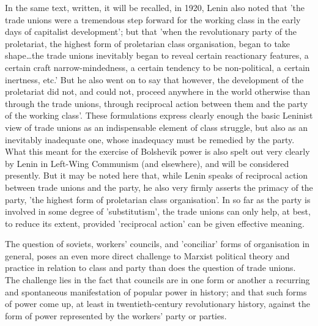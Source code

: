 In the same text, written, it will be recalled, in 1920, Lenin also noted that 'the trade unions were a tremendous step forward for the working class in the early days of capitalist development'; but that 'when the revolutionary party of the proletariat, the highest form of proletarian class organisation, began to take shape\dots the trade unions inevitably began to reveal certain reactionary features, a certain craft narrow-mindedness, a certain tendency to be non-political, a certain inertness, etc.' But he also went on to say that however, the development of the proletariat did not, and could not, proceed anywhere in the world otherwise than through the trade unions, through reciprocal action between them and the party of the working class'. These formulations express clearly enough the basic Leninist view of trade unions as an indispensable element of class struggle, but also as an inevitably inadequate one, whose inadequacy must be remedied by the party. What this meant for the exercise of Bolshevik power is also spelt out very clearly by Lenin in Left-Wing Communism (and elsewhere), and will be considered presently. But it may be noted here that, while Lenin speaks of reciprocal action between trade unions and the party, he also very firmly asserts the primacy of the party, 'the highest form of proletarian class organisation'. In so far as the party is involved in some degree of 'substitutism', the trade unions can only help, at best, to reduce its extent, provided 'reciprocal action' can be given effective meaning.

The question of soviets, workers' councils, and 'conciliar' forms of organisation in general, poses an even more direct challenge to Marxist political theory and practice in relation to class and party than does the question of trade unions. The challenge lies in the fact that councils are in one form or another a recurring and spontaneous manifestation of popular power in history; and that such forms of power come up, at least in twentieth-century revolutionary history, against the form of power represented by the workers' party or parties.

